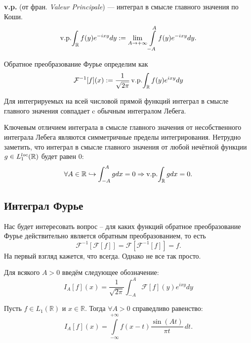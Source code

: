\begin{note}
\textbf{v.p.} (от фран. \textit{Valeur Principale}) — интеграл в смысле главного значения по Коши.
\[
\mathop{\mathrm{v.p.}}\!\int_{\mathbb{R}} f(y) e^{-ixy}dy := \lim_{A \to +\infty} \int\limits_{-A}^{A} f(y)e^{-ixy}dy.
\]
\end{note}

\begin{definition}
    Обратное преобразование Фурье определим как
    \[
        \mathcal{F}^{-1}[f](x) := \dfrac{1}{\sqrt {2\pi}}\mathop{\mathrm{v.p.}}\!\int_{\mathbb{R}} f(y)e^{ixy}dy
    \]
\end{definition}

\begin{note}
    Для интегрируемых на всей числовой прямой функций интеграл в смысле главного значения совпадает c обычным интегралом Лебега.
\end{note}

\begin{note}
    Ключевым отличием интеграла в смысле главного значения от несобственного интеграла Лебега являются симметричные пределы интегрирования.
    Нетрудно заметить, что интеграл в смысле главного значения от любой нечётной функции $g \in L_1^{loc}(\mathbb{R})$ будет равен 0:
    \[
        \forall A \in \mathbb{R} \hookrightarrow \int_{-A}^{A} g dx = 0 \Rightarrow \mathop{\mathrm{v.p.}}\!\int_{\mathbb{R}} gdx = 0.
    \]
\end{note}
\subsection{Интеграл Фурье}
\begin{question}
Нас будет интересовать вопрос -- для каких функций обратное преобразование Фурье действительно является обратным преобразованием, то есть
\[
    \mathcal{F}^{-1}[\mathcal{F}[f]] = \mathcal{F}[\mathcal{F}^{-1}[f]] = f.
\]
На первый взгляд кажется, что всегда.
Однако не все так просто.
\end{question}
\begin{definition}
    Для всякого $A > 0$ введём следующее обозначение:
    \[
        I_A[f](x) = \dfrac{1}{\sqrt {2\pi}} \int_{-A}^{A} \mathcal{F}[f](y)e^{ixy}dy
    \]
\end{definition}

\begin{lemma}[Ключевая]\label{lem:key}
Пусть $f \in L_1(\mathbb{R})$ и $x \in \mathbb{R}$. Тогда $\forall A > 0$ справедливо равенство:
\[
I_A \left[ f \right](x) = \int\limits_{-\infty}^{+\infty} f(x - t) \frac{\sin(At)}{\pi t} \, dt.
\]
\end{lemma}

